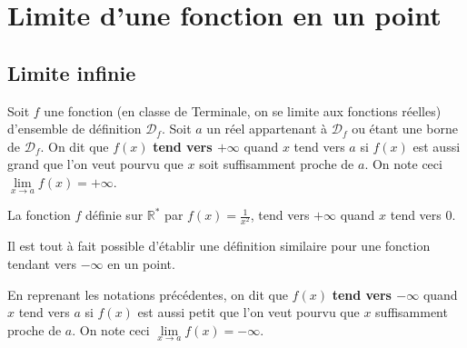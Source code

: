 






	\section{Limite d'une fonction en un point}

	\subsection{Limite infinie}

	\begin{formula}
		Soit $f$ une fonction (en classe de Terminale, on se limite aux fonctions réelles) d'ensemble de définition $\mathcal{D}_f$. Soit $a$ un réel appartenant à $\mathcal{D}_f$ ou étant une borne de $\mathcal{D}_f$.
		\newpar
		On dit que $f(x)$ \textbf{tend vers $+\infty$} quand $x$ tend vers $a$ si $f(x)$ est aussi grand que l'on veut pourvu que $x$ soit suffisamment proche de $a$.
		\newpar
		On note ceci $\lim\limits_{x \rightarrow a} f(x) = +\infty$.
	\end{formula}

	\begin{tip}[Exemple]
		La fonction $f$ définie sur $\mathbb{R}^*$ par $f(x) = \frac{1}{x^2}$, tend vers $+\infty$ quand $x$ tend vers $0$.
	\end{tip}

	Il est tout à fait possible d'établir une définition similaire pour une fonction tendant vers $-\infty$ en un point.

	\begin{tip}
		En reprenant les notations précédentes, on dit que $f(x)$ \textbf{tend vers $-\infty$} quand $x$ tend vers $a$ si $f(x)$ est aussi petit que l'on veut pourvu que $x$ suffisamment proche de $a$.
		\newpar
		On note ceci $\lim\limits_{x \rightarrow a} f(x) = -\infty$.
	\end{tip}

